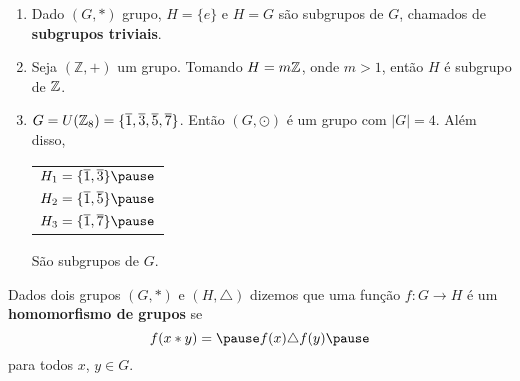 \documentclass{beamer}
\begin{document}
    \begin{frame}
        \begin{exemplos}
            \begin{enumerate}[label={\roman*})]
                \item Dado $(G,*)$ grupo, \pause $H=\{e\}$ \pause e $H=G$ \pause são subgrupos de $G$, \pause chamados de \textbf{subgrupos triviais}.\pause

                \item Seja $(\mathbb{Z},+)$ um grupo. \pause Tomando $H = m\mathbb{Z}$, \pause onde $m > 1$, então $H$ é subgrupo de $\mathbb{Z}$.\pause

                \item $G = U(\mathbb{Z}_8) = \{\overline{1}, \overline{3}, \overline{5}, \overline{7}\}$. \pause Então $(G,\odot)$ é um grupo \pause com $|G| = 4$. \pause Além disso,\pause
                \begin{center}
                    \begin{tabular}{l}
                        $H_1 = \{\overline{1}, \overline{3}\}\pause$\\
                        $H_2 = \{\overline{1}, \overline{5}\}\pause$\\
                        $H_3 = \{\overline{1}, \overline{7}\}\pause$
                    \end{tabular}
                \end{center}
                São subgrupos de $G$.
                \seti
            \end{enumerate}
        \end{exemplos}
    \end{frame}

    \begin{frame}
        \begin{definicao}
            Dados dois grupos $(G, *)$ \pause e $(H,\triangle)$ \pause dizemos que uma função $f : G \to H$ \pause é um \textbf{homomorfismo de grupos} se \pause
            \[
                f(x * y) = \pause f(x)\triangle f(y) \pause
            \]
            para todos $x$, $y \in G$.
        \end{definicao}
    \end{frame}
\end{document}
